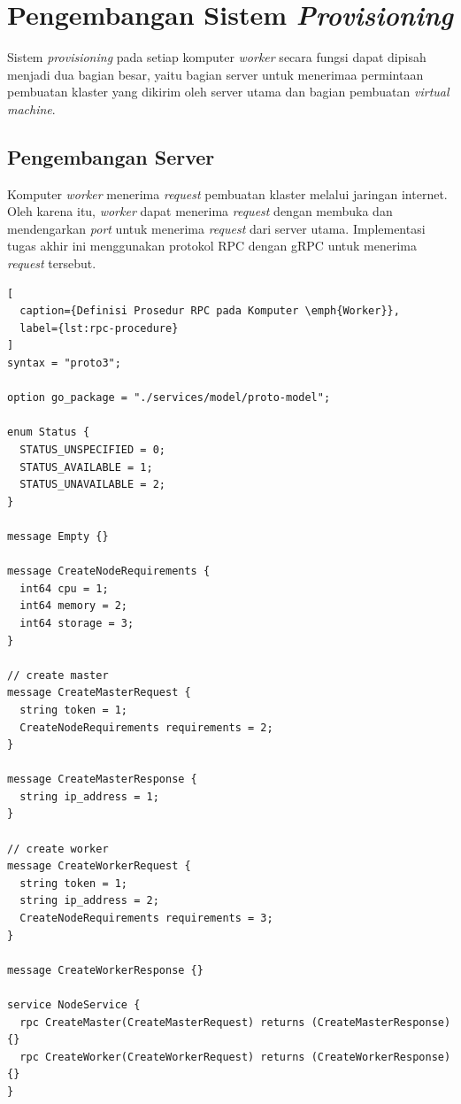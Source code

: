 \section{Pengembangan Sistem \emph{Provisioning}}
\label{sec:implementasi-sistem-provisioning}

Sistem \emph{provisioning} pada setiap komputer \emph{worker} secara fungsi dapat dipisah
menjadi dua bagian besar, yaitu bagian server untuk menerimaa permintaan pembuatan klaster yang dikirim
oleh server utama dan bagian pembuatan \emph{virtual machine}.

\subsection{Pengembangan Server}
\label{sec:server}

Komputer \emph{worker} menerima \emph{request} pembuatan klaster melalui jaringan internet.
Oleh karena itu, \emph{worker} dapat menerima \emph{request} dengan membuka dan mendengarkan \emph{port}
untuk menerima \emph{request} dari server utama. Implementasi tugas akhir ini menggunakan protokol
RPC dengan gRPC untuk menerima \emph{request} tersebut.

\begin{lstlisting}[
  caption={Definisi Prosedur RPC pada Komputer \emph{Worker}},
  label={lst:rpc-procedure}
]
syntax = "proto3";

option go_package = "./services/model/proto-model";

enum Status {
  STATUS_UNSPECIFIED = 0;
  STATUS_AVAILABLE = 1;
  STATUS_UNAVAILABLE = 2;
}

message Empty {}

message CreateNodeRequirements {
  int64 cpu = 1;
  int64 memory = 2;
  int64 storage = 3;
}

// create master
message CreateMasterRequest {
  string token = 1;
  CreateNodeRequirements requirements = 2;
}

message CreateMasterResponse {
  string ip_address = 1;
}

// create worker
message CreateWorkerRequest {
  string token = 1;
  string ip_address = 2;
  CreateNodeRequirements requirements = 3;
}

message CreateWorkerResponse {}

service NodeService {
  rpc CreateMaster(CreateMasterRequest) returns (CreateMasterResponse) {}
  rpc CreateWorker(CreateWorkerRequest) returns (CreateWorkerResponse) {}
}
\end{lstlisting}

